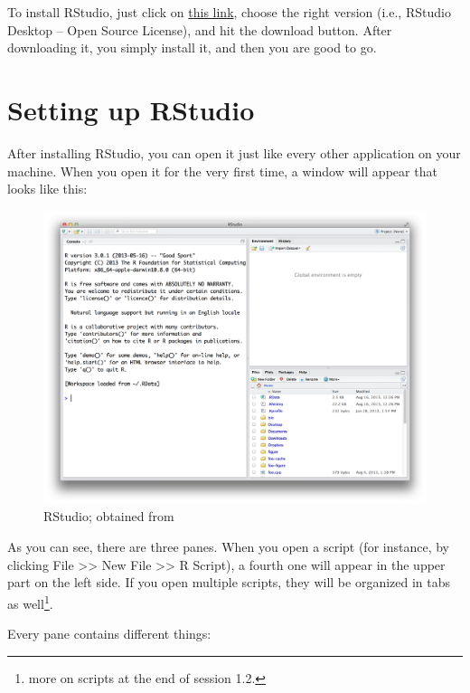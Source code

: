 \documentclass[
]{book}
\begin{document}
To install RStudio, just click on \href{https://rstudio.com/products/rstudio/download/}{this link}, choose the right version (i.e., RStudio Desktop -- Open Source License), and hit the download button. After downloading it, you simply install it, and then you are good to go.

\hypertarget{setting-up-rstudio}{%
\section{Setting up RStudio}\label{setting-up-rstudio}}

After installing RStudio, you can open it just like every other application on your machine. When you open it for the very first time, a window will appear that looks like this:

\begin{figure}
\centering
\includegraphics{figures/rstudio.png}
\caption{RStudio; obtained from \citet{grolemund2014}}
\end{figure}

As you can see, there are three panes. When you open a script (for instance, by clicking File \textgreater\textgreater{} New File \textgreater\textgreater{} R Script), a fourth one will appear in the upper part on the left side. If you open multiple scripts, they will be organized in tabs as well\footnote{more on scripts at the end of session 1.2.}.

Every pane contains different things:
\end{document}
